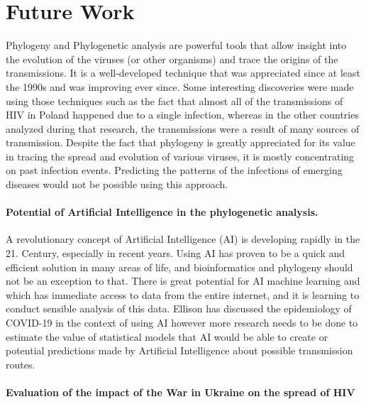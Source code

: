 \chapter{Future Work}

Phylogeny and Phylogenetic analysis are powerful tools that allow insight into the evolution of the viruses (or other organisms) and trace the origins of the transmissions. 
It is a well-developed technique that was appreciated since at least the 1990s and was improving ever since. 
Some interesting discoveries were made using those techniques such as the fact that almost all of the transmissions of HIV in Poland happened due to a single infection, whereas in the other countries analyzed during that research, the transmissions were a result of many sources of transmission. \cite{paraskevis_2009_tracing}
Despite the fact that phylogeny is greatly appreciated for its value in tracing the spread and evolution of various viruses, it is mostly concentrating on past infection events.
Predicting the patterns of the infections of emerging diseases would not be possible using this approach. 

\subsubsection{Potential of Artificial Intelligence in the phylogenetic analysis.}

A revolutionary concept of Artificial Intelligence (AI) is developing rapidly in the 21. Century, especially in recent years. 
Using AI has proven to be a quick and efficient solution in many areas of life, and bioinformatics and phylogeny should not be an exception to that. 
There is great potential for AI machine learning and which has immediate access to data from the entire internet, and it is learning to conduct sensible analysis of this data. \cite{jiang_2022_quo}
Ellison has discussed the epidemiology of COVID-19 in the context of using AI however more research needs to be done to estimate the value of statistical models that AI would be able to create or potential predictions made by Artificial Intelligence about possible transmission routes. \cite{ellison_2020_covid19}  

\subsubsection{Evaluation of the impact of the War in Ukraine on the spread of HIV}

